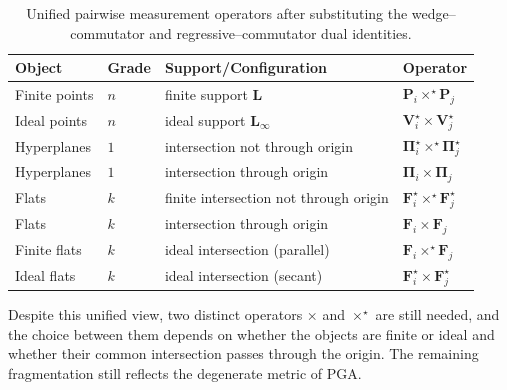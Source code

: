 \documentclass{birkjour}
\theoremstyle{definition}
\theoremstyle{remark}
\begin{document}
\begin{table}[H]
\centering
\caption{Unified pairwise measurement operators after substituting
the wedge--commutator and regressive--commutator dual identities.}
\label{tab:cr-formulas-unified}
\setlength{\tabcolsep}{5pt}
\begin{tabular}{@{}llll@{}}
\toprule
Object & Grade & Support/Configuration & Operator \\
\midrule
\rowcolor{C0!15}
Finite points  & $n$ & finite support $\mathbf{L}$
  & $\mathbf{P}_i \times^\star \mathbf{P}_j$ \\
\rowcolor{C1!15}
Ideal points   & $n$ & ideal support $\mathbf{L}_\infty$
  & $\mathbf{V}_i^\star \times \mathbf{V}_j^\star$ \\
\midrule
\rowcolor{C0!15}
Hyperplanes    & $1$ & intersection not through origin
  & $\boldsymbol{\Pi}_i^\star \times^\star \boldsymbol{\Pi}_j^\star$ \\
\rowcolor{C1!15}
Hyperplanes    & $1$ & intersection through origin
  & $\boldsymbol{\Pi}_i \times \boldsymbol{\Pi}_j$ \\
\midrule
\rowcolor{C2!15}
Flats          & $k$ & finite intersection not through origin
  & $\mathbf{F}_i^\star \times^\star \mathbf{F}_j^\star$ \\
\rowcolor{C3!15}
Flats          & $k$ & intersection through origin
  & $\mathbf{F}_i \times \mathbf{F}_j$ \\
\rowcolor{C2!15}
Finite flats   & $k$ & ideal intersection (parallel)
  & $\mathbf{F}_i \times^\star \mathbf{F}_j$ \\
\rowcolor{C3!15}
Ideal flats    & $k$ & ideal intersection (secant)
  & $\mathbf{F}_i^\star \times \mathbf{F}_j^\star$ \\
\bottomrule
\end{tabular}
\end{table}

Despite this unified view, two distinct operators $\times$ and
$\times^\star$ are still needed, and the choice between them depends
on whether the objects are finite or ideal and whether their common
intersection passes through the origin. The remaining fragmentation
still reflects the degenerate metric of PGA.

\end{document}
